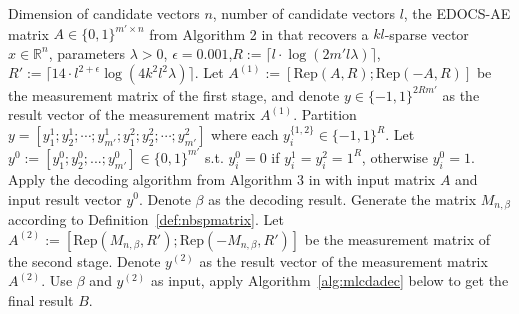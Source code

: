 \documentclass{article}
\begin{document}
\begin{algorithm}
\caption{Two-stage scheme of the MLC under Assumption~\ref{Assumption1}: Overall description}\label{alg:2SUMLC}
\begin{algorithmic}[1]
    \Require Dimension of candidate vectors $n$, number of candidate vectors $l$, the EDOCS-AE matrix $A\in \{0,1\}^{m'\times n}$ from Algorithm 2 in \cite{li2025support} that recovers a $kl$-sparse vector $x\in \mathbb{R}^n$, parameters $\lambda>0$, $\epsilon=0.001$,$R:=\lceil l\cdot \log(2m'l\lambda)\rceil$, $R':=\lceil 14\cdot l^{2+\epsilon}\log(4k^2l^2\lambda)\rceil$.
    \State Let $A^{(1)}:=[\mathrm{Rep}(A,R);\mathrm{Rep}(-A,R)]$ be the measurement matrix of the first stage, and denote $y\in\{-1,1\}^{2Rm'}$ as the result vector of the measurement matrix $A^{(1)}$. Partition $y=[y_1^1;y_2^1;\cdots;y_{m'}^1;
   y_1^2;y_2^2;\cdots;y_{m'}^2]$ where each $y_i^{\{1,2\}}\in \{-1,1\}^R$. Let $y^0:=[y_1^0;y_2^0;...;y_{m'}^0]\in\{0,1\}^{m'}$ s.t. $y_i^0=0$ if $y_i^1=y_i^2=1^R$, otherwise $y_i^0=1$. 
    \State Apply the decoding algorithm from Algorithm 3 in \cite{li2025support} with input matrix $A$ and input result vector $y^0$. Denote $\beta$ as the decoding result.
    \State Generate the matrix $M_{n,\beta}$ according to Definition~\ref{def:nbspmatrix}. 
    \State Let $A^{(2)}:=[\mathrm{Rep}(M_{n,\beta},R');\mathrm{Rep}(-M_{n,\beta},R')]$ be the measurement matrix of the second stage. 
    \State Denote $y^{(2)}$ as the result vector of the measurement matrix $A^{(2)}$. 
    \State Use $\beta$ and $y^{(2)}$ as input, apply Algorithm~\ref{alg:mlcdadec} below to get the final result $B$. 

\end{algorithmic}
\end{algorithm}
\end{document}
